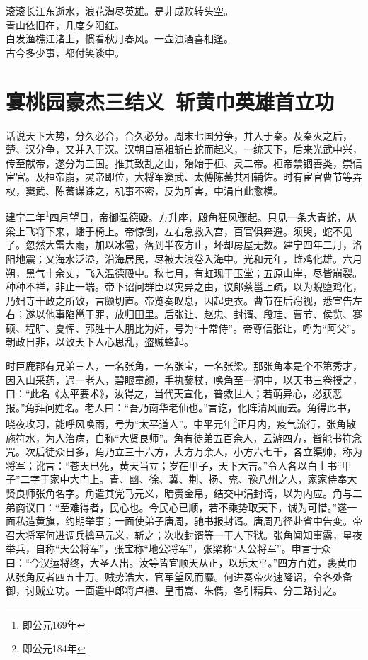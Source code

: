 \documentclass[a4paper]{article}
\begin{document}
\begin{center}
    \kaishu
    滚滚长江东逝水，浪花淘尽英雄。是非成败转头空。\\
    青山依旧在，几度夕阳红。\\

    白发渔樵江渚上，惯看秋月春风。一壶浊酒喜相逢。\\
    古今多少事，都付笑谈中。
\end{center}

\newpage
\section*{宴桃园豪杰三结义\ 斩黄巾英雄首立功}

话说天下大势，分久必合，合久必分。周末七国分争，并入于秦。及秦灭之后，楚、汉分争，又并入于汉。汉朝自高祖斩白蛇而起义，一统天下，后来光武中兴，传至献帝，遂分为三国。推其致乱之由，殆始于桓、灵二帝。桓帝禁锢善类，崇信宦官。及桓帝崩，灵帝即位，大将军窦武、太傅陈蕃共相辅佐。时有宦官曹节等弄权，窦武、陈蕃谋诛之，机事不密，反为所害，中涓自此愈横。

建宁二年\footnote[1]{{即公元169年}}四月望日，帝御温德殿。方升座，殿角狂风骤起。只见一条大青蛇，从梁上飞将下来，蟠于椅上。帝惊倒，左右急救入宫，百官俱奔避。须臾，蛇不见了。忽然大雷大雨，加以冰雹，落到半夜方止，坏却房屋无数。建宁四年二月，洛阳地震；又海水泛溢，沿海居民，尽被大浪卷入海中。光和元年，雌鸡化雄。六月朔，黑气十余丈，飞入温德殿中。秋七月，有虹现于玉堂；五原山岸，尽皆崩裂。种种不祥，非止一端。帝下诏问群臣以灾异之由，议郎蔡邕上疏，以为蜺堕鸡化，乃妇寺干政之所致，言颇切直。帝览奏叹息，因起更衣。曹节在后窃视，悉宣告左右；遂以他事陷邕于罪，放归田里。后张让、赵忠、封谞、段珪、曹节、侯览、蹇硕、程旷、夏恽、郭胜十人朋比为奸，号为“十常侍”。帝尊信张让，呼为“阿父”。朝政日非，以致天下人心思乱，盗贼蜂起。

时巨鹿郡有兄弟三人，一名张角，一名张宝，一名张梁。那张角本是个不第秀才，因入山采药，遇一老人，碧眼童颜，手执藜杖，唤角至一洞中，以天书三卷授之，曰：“此名《太平要术》，汝得之，当代天宣化，普救世人；若萌异心，必获恶报。”角拜问姓名。老人曰：“吾乃南华老仙也。”言讫，化阵清风而去。角得此书，晓夜攻习，能呼风唤雨，号为“太平道人”。中平元年\footnote[2]{{即公元184年}}正月内，疫气流行，张角散施符水，为人治病，自称“大贤良师”。角有徒弟五百余人，云游四方，皆能书符念咒。次后徒众日多，角乃立三十六方，大方万余人，小方六七千，各立渠帅，称为将军；讹言：“苍天已死，黄天当立；岁在甲子，天下大吉。”令人各以白土书“甲子”二字于家中大门上。青、幽、徐、冀、荆、扬、兖、豫八州之人，家家侍奉大贤良师张角名字。角遣其党马元义，暗赍金帛，结交中涓封谞，以为内应。角与二弟商议曰：“至难得者，民心也。今民心已顺，若不乘势取天下，诚为可惜。”遂一面私造黄旗，约期举事；一面使弟子唐周，驰书报封谞。唐周乃径赴省中告变。帝召大将军何进调兵擒马元义，斩之；次收封谞等一干人下狱。张角闻知事露，星夜举兵，自称“天公将军”，张宝称“地公将军”，张梁称“人公将军”。申言于众曰：“今汉运将终，大圣人出。汝等皆宜顺天从正，以乐太平。”四方百姓，裹黄巾从张角反者四五十万。贼势浩大，官军望风而靡。何进奏帝火速降诏，令各处备御，讨贼立功。一面遣中郎将卢植、皇甫嵩、朱儁，各引精兵、分三路讨之。
\end{document}
